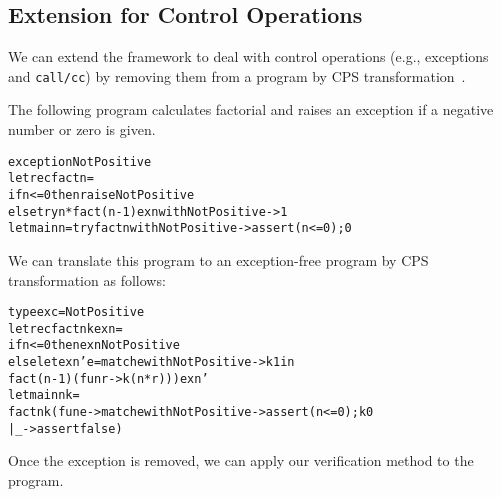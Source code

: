 \subsection{Extension for Control Operations}
\label{sec:control} We can extend the framework to deal with control
operations (e.g., exceptions and \texttt{call/cc}) by removing them
from a program by CPS transformation~\cite{Nielsen2001}.

The following program calculates factorial and raises an exception if
a negative number or zero is given.
\begin{alltt}
exception NotPositive
let rec fact n =
  if n <= 0 then raise NotPositive
  else try n * fact (n - 1) exn with NotPositive -> 1
let main n = try fact n with NotPositive -> assert (n <= 0); 0
\end{alltt}
We can translate this program to an exception-free program by CPS transformation as follows:
\begin{alltt}
type exc = NotPositive
let rec fact n k exn =
  if n <= 0 then exn NotPositive
  else let exn' e = match e with NotPositive -> k 1 in
         fact (n - 1) (fun r -> k (n * r))) exn'
let main n k =
  fact n k (fun e -> match e with NotPositive -> assert (n <= 0); k 0
                                | _ -> assert false)
\end{alltt}
Once the exception is removed, we can apply our verification method to the
program.
